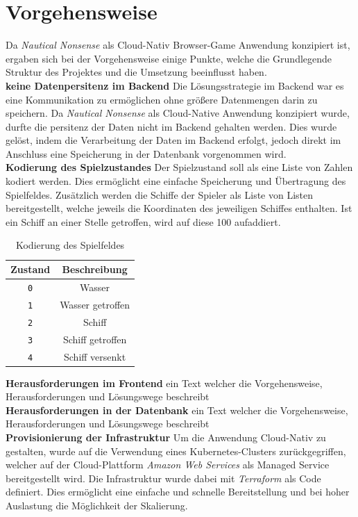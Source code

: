 \documentclass[a4paper, 10pt, conference]{IEEEtran}
\begin{document}
\section{Vorgehensweise}\label{sec:vorgehensweise}
Da \textit{Nautical Nonsense} als Cloud-Nativ Browser-Game Anwendung konzipiert ist, ergaben sich bei der Vorgehensweise einige Punkte, welche die Grundlegende Struktur des Projektes und die Umsetzung beeinflusst haben.\\

\textbf{keine Datenpersitenz im Backend} Die Lösungsstrategie im Backend war es eine Kommunikation zu ermöglichen ohne größere Datenmengen darin zu speichern. Da \textit{Nautical Nonsense} als Cloud-Native Anwendung konzipiert wurde, durfte die persitenz der Daten nicht im Backend gehalten werden. Dies wurde gelöst, indem die Verarbeitung der Daten im Backend erfolgt, jedoch direkt im Anschluss eine Speicherung in der Datenbank vorgenommen wird. \\

\textbf{Kodierung des Spielzustandes} 
Der Spielzustand soll als eine Liste von Zahlen kodiert werden. Dies ermöglicht eine einfache Speicherung und Übertragung des Spielfeldes. 
Zusätzlich werden die Schiffe der Spieler als Liste von Listen bereitgestellt, welche jeweils die Koordinaten des jeweiligen Schiffes enthalten. Ist ein Schiff an einer Stelle getroffen, wird auf diese 100 aufaddiert. \\

\begin{table}[h!]
    \begin{center}
        \caption{Kodierung des Spielfeldes}
        \label{tab:gamefield}
        \begin{tabular}{|c|c|}
            \textbf{Zustand} & \textbf{Beschreibung}\\
            \hline
            \texttt{0}	& Wasser\\
            \texttt{1}	& Wasser getroffen\\
            \texttt{2}	& Schiff\\
            \texttt{3}	& Schiff getroffen\\
            \texttt{4}	& Schiff versenkt\\
        \end{tabular}
    \end{center}
\end{table}

\textbf{Herausforderungen im Frontend} 
ein Text welcher die Vorgehensweise, Herausforderungen und Lösungswege beschreibt\\
\textbf{Herausforderungen in der Datenbank} 
ein Text welcher die Vorgehensweise, Herausforderungen und Lösungswege beschreibt\\
\textbf{Provisionierung der Infrastruktur} 
Um die Anwendung Cloud-Nativ zu gestalten, wurde auf die Verwendung eines Kubernetes-Clusters zurückgegriffen, welcher auf der Cloud-Plattform \textit{Amazon Web Services} als Managed Service bereitgestellt wird. Die Infrastruktur wurde dabei mit \textit{Terraform} als Code definiert. Dies ermöglicht eine einfache und schnelle Bereitstellung und bei hoher Auslastung die Möglichkeit der Skalierung.\\
\end{document}
